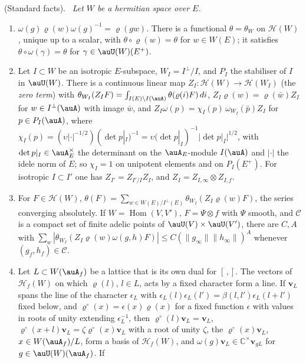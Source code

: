 \documentclass[10pt]{amsart}
\theoremstyle{definition}
\theoremstyle{remark}
\newcommand{\C}{\mathbb C}
\providecommand{\auHom}{\operatorname{Hom}}
\providecommand{\psHS}{\mathcal H}
\providecommand{\psZ}{Z}
\providecommand{\psrho}{\varrho}
\providecommand{\psvac}{\mathbf v}
\newenvironment{quotedthm}[2]{\par\medskip\noindent\begingroup
  \textbf{#1}#2.\ \itshape\ignorespaces}{\endgroup\par\medskip}
\begin{document}
\begin{quotedthm}{\cite[Lemma~5.2]{P49}}{ (Standard facts)}
Let $W$ be a hermitian space over $E$.
\begin{enumerate}
\item[(W1)] $\omega(g)\psrho(w)\omega(g)^{-1}=\psrho(gw)$. There is a functional $\theta=\theta_W$
on $\psHS(W)$, unique up to a scalar, with $\theta\circ\psrho(w)=\theta$ for $w\in W(E)$; it
satisfies $\theta\circ\omega(\gamma)=\theta$ for $\gamma\in\auU(W)(E^+)$.
\item[(W2)] Let $I\subset W$ be an isotropic $E$-subspace, $W_I=I^\perp/I$, and $P_I$ the stabiliser
of $I$ in $\auU(W)$. There is a continuous linear map $\psZ_I\colon\psHS(W)\to\psHS(W_I)$ (the
\emph{zero term}) with $\theta_{W_I}(\psZ_IF)=\int_{I(E)\backslash I(\auA)}\theta(\psrho(i)F)\,di$,
$\psZ_I\psrho(w)=\psrho(\bar w)\psZ_I$ for $w\in I^\perp(\auA)$ with image $\bar w$, and
$\psZ_I\omega(p)=\chi_I(p)\,\omega_{W_I}(\bar p)\psZ_I$ for $p\in P_I(\auA)$, where $\chi_I(p)=
(\upsilon|\cdot|^{-1/2})(\det p|_I)^{-1}=\upsilon(\det p|_I)^{-1}|\det p|_I|^{1/2}$, with
$\det p|_I\in\auA_E^\times$ the determinant on the $\auA_E$-module $I(\auA)$ and $|\cdot|$ the
idele norm of $E$; so $\chi_I=1$ on unipotent elements and on $P_I(E^+)$.
For isotropic $I\subset I'$ one has $\psZ_{I'}=\psZ_{I'/I}\psZ_I$, and $\psZ_I=\psZ_{I,\infty}
\otimes\psZ_{I,f}$.
\item[(W3)] For $F\in\psHS(W)$, $\theta(F)=\sum_{w\in W(E)/I^\perp(E)}\theta_{W_I}(\psZ_I\psrho(w)F)$,
the series converging absolutely. If $W=\auHom(V,V')$, $F=\Psi\otimes f$ with $\Psi$ smooth, and
$\mathcal C$ is a compact set of finite adelic points of $\auU(V)\times\auU(V')$, there are $C,A$ with
$\sum_w|\theta_{W_I}(\psZ_I\psrho(w)\omega(g,h)F)|\le C(\|g_\infty\|\|h_\infty\|)^A$ whenever
$(g_f,h_f)\in\mathcal C$.
\item[(W4)] Let $L\subset W(\auA_f)$ be a lattice that is its own dual for $[\,,]$. The vectors of
$\psHS_f(W)$ on which $\psrho(l)$, $l\in L$, acts by a fixed character form a line. If $\psvac_L$
spans the line of the character $\epsilon_L$ with $\epsilon_L(l)\epsilon_L(l')=\beta(l,l')
\epsilon_L(l+l')$ fixed below, and $\psrho^\circ(x)=\epsilon(x)\psrho(x)$ for a fixed function
$\epsilon$ with values in roots of unity extending $\epsilon_L^{-1}$, then
$\psrho^\circ(l)\psvac_L=\psvac_L$, $\psrho^\circ(x+l)\psvac_L=\zeta\psrho^\circ(x)\psvac_L$ with a
root of unity $\zeta$, the $\psrho^\circ(x)\psvac_L$, $x\in W(\auA_f)/L$, form a basis of
$\psHS_f(W)$, and $\omega(g)\psvac_L\in\C^\times\psvac_{gL}$ for $g\in\auU(W)(\auA_f)$. If

\end{enumerate}
\end{quotedthm}
\end{document}
